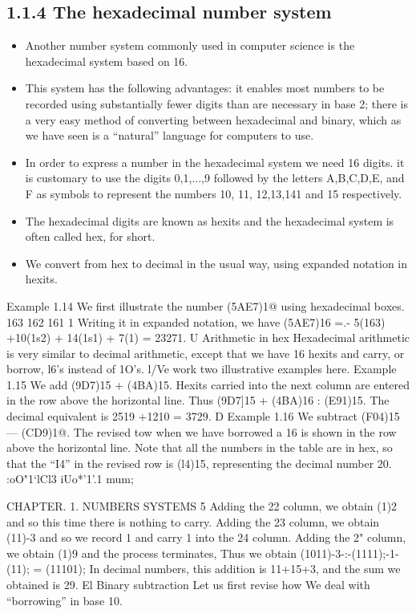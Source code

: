\documentclass[12pt]{article}
\begin{document}
\subsection{1.1.4 The hexadecimal number system}
\begin{itemize}
    \item Another number system commonly used in computer science is the hexadecimal system based
on 16. 
\item This system has the following advantages: it enables most numbers to be recorded using
substantially fewer digits than are necessary in base 2; there is a very easy method of converting
between hexadecimal and binary, which as we have seen is a “natural” language for computers to
use.
\item In order to express a number in the hexadecimal system we need 16 digits. it is customary to
use the digits 0,1,...,9 followed by the letters A,B,C,D,E, and F as symbols to represent the
numbers 10, 11, 12,13,141 and 15 respectively. 
\item The hexadecimal digits are known as hexits and
the hexadecimal system is often called hex, for short.
\item We convert from hex to decimal in the usual way, using expanded notation in hexits.
\end{itemize}

Example 1.14 We first illustrate the number (5AE7)1@ using hexadecimal boxes.
163 162 161 1
Writing it in expanded notation, we have
(5AE7)16 =.- 5(163) +10(1s2) + 14(1s1) + 7(1)
= 23271. U
Arithmetic in hex
Hexadecimal arithmetic is very similar to decimal arithmetic, except that we have 16 hexits and
carry, or borrow, l6’s instead of 1O’s. l/Ve work two illustrative examples here.
Example 1.15 We add (9D7)15 + (4BA)15. Hexits carried into the next column are entered in
the row above the horizontal line.
Thus (9D7]15 + (4BA)16 : (E91)15. The decimal equivalent is 2519 +1210 = 3729. D
Example 1.16 We subtract (F04)15 — (CD9)1@. The revised tow when we have borrowed a 16 is
shown in the row above the horizontal line. Note that all the numbers in the table are in hex, so
that the “I4” in the revised row is (l4)15, representing the decimal number 20.
:oO"1‘lCl3
i\:Uo*'1'.1
mum;


CHAPTER. 1. NUMBERS SYSTEMS 5
Adding the 22 column, we obtain (1)2 and so this time there is nothing to carry. Adding the
23 column, we obtain (11)-3 and so we record 1 and carry 1 into the 24 column. Adding the
2" column, we obtain (1)9 and the process terminates,
Thus we obtain (1011)-3-:-(1111);-1-(11); = (11101); In decimal numbers, this addition is 11+15+3,
and the sum we obtained is 29. El
Binary subtraction
Let us first revise how We deal with “borrowing” in base 10.
\end{document}
